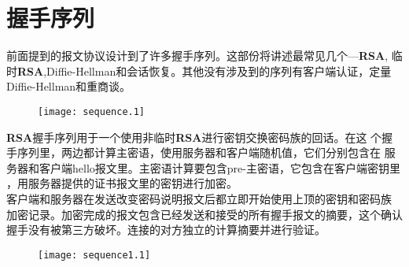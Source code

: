 \documentclass[11pt,dvips]{article}
\newcommand{\bfs}[1]{{\bf{#1}}}
\begin{document}
\section{握手序列}

前面提到的报文协议设计到了许多握手序列。这部份将讲述最常见几个---\bfs{RSA},
临时\bfs{RSA},Diffie-Hellman和会话恢复。其他没有涉及到的序列有客户端认证，定量Diffie-Hellman和重商谈。\\

%
%
% 
% 
%
%
%
%
%
\begin{figure}

\texttt{[image: sequence.1]}

\end{figure}

                
\bfs{RSA}握手序列用于一个使用非临时\bfs{RSA}进行密钥交换密码族的回话。在这
个握手序列里，两边都计算主密语，使用服务器和客户端随机值，它们分别包含在
服务器和客户端hello报文里。主密语计算要包含pre-主密语，它包含在客户端密钥里
，用服务器提供的证书报文里的密钥进行加密。\\

客户端和服务器在发送改变密码说明报文后都立即开始使用上顶的密钥和密码族
加密记录。加密完成的报文包含已经发送和接受的所有握手报文的摘要，这个确认
握手没有被第三方破坏。连接的对方独立的计算摘要并进行验证。


\begin{figure}
\texttt{[image: sequence1.1]}

\end{figure}
\end{document}

